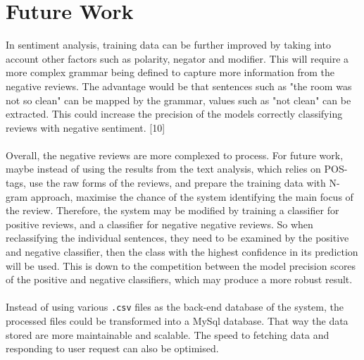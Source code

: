 \documentclass[a4paper]{report}
\newcommand{\code}[1]{\texttt{#1}}
\begin{document}
{{\section{Future Work}
In sentiment analysis, training data can be further improved by taking into account other factors such as polarity, negator and modifier. This will require a more complex grammar being defined to capture more information from the negative reviews. The advantage would be that sentences such as "the room was not so clean" can be mapped by the grammar, values such as "not clean" can be extracted. This could increase the precision of the models correctly classifying reviews with negative sentiment. [10]
\\\\
Overall, the negative reviews are more complexed to process. For future work, maybe instead of using the results from the text analysis, which relies on POS-tags, use the raw forms of the reviews, and prepare the training data with N-gram approach, maximise the chance of the system identifying the main focus of the review. Therefore, the system may be modified by training a classifier for positive reviews, and a classifier for negative negative reviews. So when reclassifying the individual sentences, they need to be examined by the positive and negative classifier, then the class with the highest confidence in its prediction will be used. This is down to the competition between the model precision scores of the positive and negative classifiers, which may produce a more robust result.
\\\\
Instead of using various \code{.csv} files as the back-end database of the system, the processed files could be transformed into a MySql database. That way the data stored are more maintainable and scalable. The speed to fetching data and responding to user request can also be optimised.




}}
\end{document}
